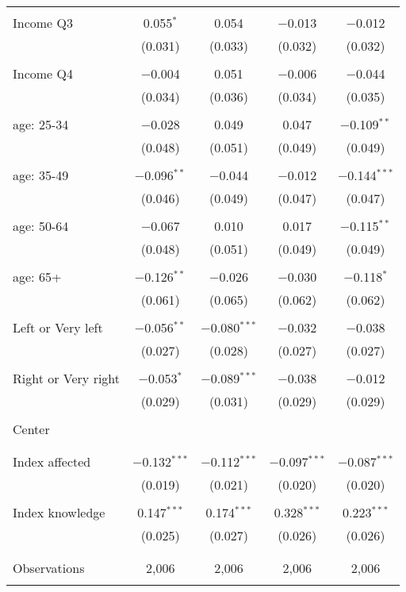 \begin{tabular}{@{\extracolsep{5pt}}lcccc}
  & & & & \\ 
 Income Q3 & 0.055$^{*}$ & 0.054 & $-$0.013 & $-$0.012 \\ 
  & (0.031) & (0.033) & (0.032) & (0.032) \\ 
  & & & & \\ 
 Income Q4 & $-$0.004 & 0.051 & $-$0.006 & $-$0.044 \\ 
  & (0.034) & (0.036) & (0.034) & (0.035) \\ 
  & & & & \\ 
 age: 25-34 & $-$0.028 & 0.049 & 0.047 & $-$0.109$^{**}$ \\ 
  & (0.048) & (0.051) & (0.049) & (0.049) \\ 
  & & & & \\ 
 age: 35-49 & $-$0.096$^{**}$ & $-$0.044 & $-$0.012 & $-$0.144$^{***}$ \\ 
  & (0.046) & (0.049) & (0.047) & (0.047) \\ 
  & & & & \\ 
 age: 50-64 & $-$0.067 & 0.010 & 0.017 & $-$0.115$^{**}$ \\ 
  & (0.048) & (0.051) & (0.049) & (0.049) \\ 
  & & & & \\ 
 age: 65+ & $-$0.126$^{**}$ & $-$0.026 & $-$0.030 & $-$0.118$^{*}$ \\ 
  & (0.061) & (0.065) & (0.062) & (0.062) \\ 
  & & & & \\ 
 Left or Very left & $-$0.056$^{**}$ & $-$0.080$^{***}$ & $-$0.032 & $-$0.038 \\ 
  & (0.027) & (0.028) & (0.027) & (0.027) \\ 
  & & & & \\ 
 Right or Very right & $-$0.053$^{*}$ & $-$0.089$^{***}$ & $-$0.038 & $-$0.012 \\ 
  & (0.029) & (0.031) & (0.029) & (0.029) \\ 
  & & & & \\ 
 Center &  &  &  &  \\ 
  &  &  &  &  \\ 
  & & & & \\ 
 Index affected & $-$0.132$^{***}$ & $-$0.112$^{***}$ & $-$0.097$^{***}$ & $-$0.087$^{***}$ \\ 
  & (0.019) & (0.021) & (0.020) & (0.020) \\ 
  & & & & \\ 
 Index knowledge & 0.147$^{***}$ & 0.174$^{***}$ & 0.328$^{***}$ & 0.223$^{***}$ \\ 
  & (0.025) & (0.027) & (0.026) & (0.026) \\ 
  & & & & \\ 
\hline \\[-1.8ex] 

Observations & 2,006 & 2,006 & 2,006 & 2,006 \\ 
\hline 
\hline \\[-1.8ex] 
\end{tabular} 